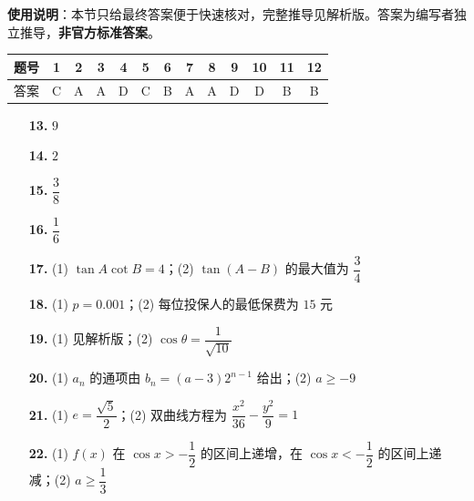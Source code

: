 
\begin{gknotice}
\textbf{使用说明}：本节只给最终答案便于快速核对，完整推导见解析版。答案为编写者独立推导，\textbf{非官方标准答案}。
\end{gknotice}

\begin{center}\begin{tabular}{ccccccccccccc}
\toprule
题号 & 1 & 2 & 3 & 4 & 5 & 6 & 7 & 8 & 9 & 10 & 11 & 12 \\
\midrule
答案 & C & A & A & D & C & B & A & A & D & D & B & B \\
\bottomrule
\end{tabular}\end{center}

\begin{itemize}[leftmargin=2.6em]
  \item[\textbf{13.}] $9$
  \item[\textbf{14.}] $2$
  \item[\textbf{15.}] $\dfrac38$
  \item[\textbf{16.}] $\dfrac16$
\end{itemize}

\begin{itemize}[leftmargin=2.6em]
  \item[\textbf{17.}] (1) $\tan A\cot B=4$；(2) $\tan(A-B)$ 的最大值为 $\dfrac34$
  \item[\textbf{18.}] (1) $p=0.001$；(2) 每位投保人的最低保费为 $15$ 元
  \item[\textbf{19.}] (1) 见解析版；(2) $\cos\theta=\dfrac1{\sqrt{10}}$
  \item[\textbf{20.}] (1) $a_n$ 的通项由 $b_n=(a-3)2^{n-1}$ 给出；(2) $a\geqslant-9$
  \item[\textbf{21.}] (1) $e=\dfrac{\sqrt5}{2}$；(2) 双曲线方程为 $\dfrac{x^2}{36}-\dfrac{y^2}{9}=1$
  \item[\textbf{22.}] (1) $f(x)$ 在 $\cos x>-\dfrac12$ 的区间上递增，在 $\cos x<-\dfrac12$ 的区间上递减；(2) $a\geqslant\dfrac13$
\end{itemize}
